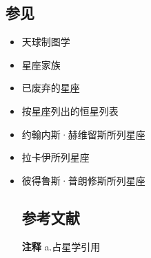 \subsection{参见}  
\begin{itemize}
\item 天球制图学  
\item 星座家族  
\item 已废弃的星座  
\item 按星座列出的恒星列表  
\item 约翰内斯·赫维留斯所列星座  
\item 拉卡伊所列星座  
\item 彼得鲁斯·普朗修斯所列星座  
\subsection{参考文献} 
\textbf{注释}
a.占星学引用


\end{itemize}
